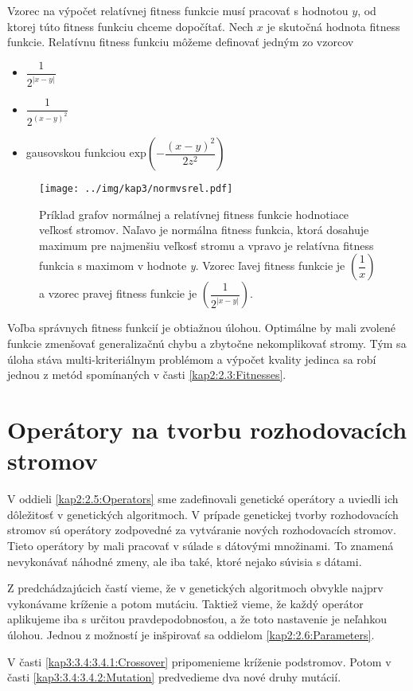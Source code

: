 Vzorec na výpočet relatívnej fitness funkcie musí pracovať s hodnotou $y$, od ktorej túto fitness funkciu chceme dopočítať. Nech $x$ je skutočná hodnota fitness funkcie. Relatívnu fitness funkciu môžeme definovať jedným zo vzorcov
\begin{itemize}
\item $\dfrac{1}{2^{|x-y|}}$ 
\item $\dfrac{1}{2^{(x-y)^2}}$
\item gausovskou funkciou $\mbox{exp}\left(-\dfrac{(x-y)^2}{2z^2}\right)$
\end{itemize}

\begin{figure}[h]
\centering
\centerline{\mbox{\texttt{[image: ../img/kap3/normvsrel.pdf]}}}
\caption{Príklad grafov normálnej a relatívnej fitness funkcie hodnotiace veľkosť stromov. Naľavo je normálna fitness funkcia, ktorá dosahuje maximum pre najmenšiu veľkosť stromu a vpravo je relatívna fitness funkcia s maximom v hodnote \emph{y}. Vzorec ľavej fitness funkcie je $\left(\dfrac{1}{x}\right)$ a vzorec pravej fitness funkcie je $\left(\dfrac{1}{2^{|x-y|}}\right)$.}\label{fig:normalvsrelative}
\end{figure}

Voľba správnych fitness funkcií je obtiažnou úlohou. Optimálne by mali zvolené funkcie zmenšovať generalizačnú chybu a zbytočne nekomplikovať stromy. Tým sa úloha stáva multi-kriteriálnym problémom a výpočet kvality jedinca sa robí jednou z metód spomínaných v časti \ref{kap2:2.3:Fitnesses}.
\section{Operátory na tvorbu rozhodovacích stromov}\label{kap3:3.4:Operators}
V oddieli \ref{kap2:2.5:Operators} sme zadefinovali genetické operátory a uviedli ich dôležitosť v genetických algoritmoch. V prípade genetickej tvorby rozhodovacích stromov sú operátory zodpovedné za vytváranie nových rozhodovacích stromov. Tieto operátory by mali pracovať v súlade s dátovými množinami. To znamená nevykonávať náhodné zmeny, ale iba také, ktoré nejako súvisia s dátami.

Z predchádzajúcich častí vieme, že v genetických algoritmoch obvykle najprv vykonávame kríženie a potom mutáciu. Taktiež vieme, že každý operátor aplikujeme iba s určitou pravdepodobnosťou, a že toto nastavenie je neľahkou úlohou. Jednou z možností je inšpirovať sa oddielom \ref{kap2:2.6:Parameters}.

V časti \ref{kap3:3.4:3.4.1:Crossover} pripomenieme kríženie podstromov. Potom v časti \ref{kap3:3.4:3.4.2:Mutation} predvedieme dva nové druhy mutácií.

